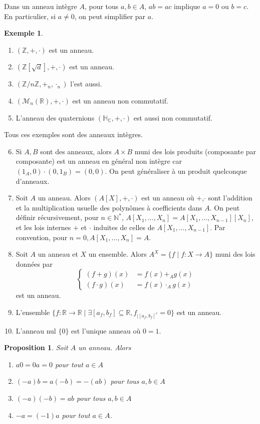 \documentclass{article}
\newcommand{\N}{\mathbb{N}}
\newcommand{\Z}{\mathbb{Z}}
\newcommand{\R}{\mathbb{R}}
\newcommand{\C}{\mathbb{C}}
\renewcommand{\H}{\mathbb{H}}
\newcommand{\M}{\mathcal{M}}
\theoremstyle{plain}
\newtheorem{proposition}[theorem]{Proposition}
\theoremstyle{definition}
\newtheorem{example}[theorem]{Exemple}
\theoremstyle{remark}
\begin{document}
Dans un anneau intègre $A$, pour tous $a,b \in A$, $ab = ac$ implique $a = 0$ ou $b = c$. En particulier, si $a \ne 0$, on peut simplifier par $a$.

\begin{example}
    \begin{enumerate}
        \item $(\Z,+,\cdot)$ est un anneau.
        \item $(\Z[\sqrt{d}],+,\cdot)$ est un anneau.
        \item $(\Z/n\Z,+_n,\cdot_n)$ l'est aussi.
        \item $(\M_n(\R),+,\cdot)$ est un anneau non commutatif.
        \item L'anneau des quaternions $(\H_\C,+,\cdot)$ est aussi non commutatif.
    \end{enumerate}
    Tous ces exemples sont des anneaux intègres.
    \begin{enumerate}
        \setcounter{enumi}{5}
        \item Si $A,B$ sont des anneaux, alors $A\times B$ muni des lois produits (composante par composante) est un anneau en général non intègre car $(1_A,0) \cdot (0,1_B) = (0,0)$. On peut généraliser à un produit quelconque d'anneaux.
        \item Soit $A$ un anneau. Alors $(A[X],+,\cdot)$ est un anneau où $+$,$\cdot$ sont l'addition et la multiplication usuelle des polynômes à coefficients dans $A$. On peut définir récursivement, pour $n \in \N^*$, $A[X_1,\dots,X_n] = A[X_1,\dots,X_{n-1}][X_n]$, et les lois internes $+$ et $\cdot$ induites de celles de $A[X_1,\dots,X_{n-1}]$. Par convention, pour $n = 0, A[X_1,\dots,X_n] = A$.
        \item Soit $A$ un anneau et $X$ un ensemble. Alors $A^X = \{f \mid f : X \to A\}$ muni des lois données par
        \[\begin{cases}
            (f+g)(x) & = f(x) +_A g(x) \\
            (f\cdot g)(x) & = f(x) \cdot_A g(x)
        \end{cases}\]
        est un anneau.
        \item L'ensemble $\{f : \R \to \R \mid \exists [a_f,b_f] \subseteq \R, f_{\mid [a_f,b_f]^c} = 0\}$ est un anneau.
        \item L'anneau nul $\{0\}$ est l'unique anneau où $0 = 1$.
    \end{enumerate}
\end{example}

\begin{proposition}
    Soit $A$ un anneau. Alors
    \begin{enumerate}
        \item $a 0 = 0 a = 0$ pour tout $a \in A$
        \item $(-a)b = a(-b) = -(ab)$ pour tous $a,b\in A$
        \item $(-a)(-b) = ab$ pour tous $a,b \in A$
        \item $-a = (-1)a$ pour tout $a \in A$.
    \end{enumerate}
\end{proposition}
\end{document}
